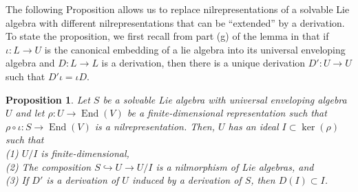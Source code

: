 \documentclass[10pt]{amsart}
\newtheorem{prop}[thm]{Proposition}
\theoremstyle{definition}
\theoremstyle{remark}
\numberwithin{equation}{section}
\DeclareMathOperator{\End}{End}
\begin{document}
The following Proposition allows us to replace nilrepresentations of a solvable Lie algebra with different nilrepresentations that can be ``extended'' by a derivation. To state the proposition, we first recall from part (g) of the lemma in \cite{Lusztig15.5} that if $\iota: L \to U$ is the canonical embedding of a lie algebra into its universal enveloping algebra and $D: L \to L$ is a derivation, then there is a unique derivation $D': U \to U$ such that $D' \iota = \iota D$.

\begin{prop} \label{prop:DealWithSolvableCase}
Let $S$ be a solvable Lie algebra with universal enveloping algebra $U$ and let $\rho: U \to \End(V)$ be a finite-dimensional representation such that $\rho\circ \iota: S \to \End(V)$ is a nilrepresentation. Then, $U$ has an ideal $I \subset \ker(\rho)$ such that \\
(1) $U/I$ is finite-dimensional,  \\
(2) The composition $S \hookrightarrow U \to U/I$ is a nilmorphism of Lie algebras, and \\
(3) If $D'$ is a derivation of $U$ induced by a derivation of $S$, then $D(I)\subset I$.
\end{prop}
\end{document}
